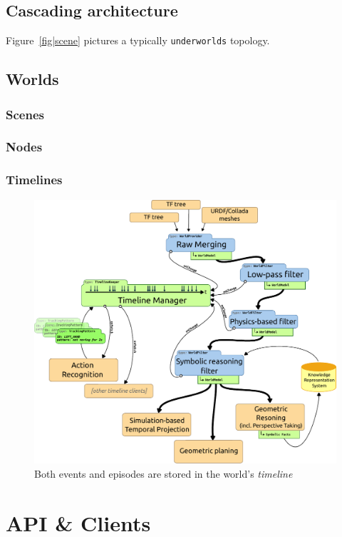 \documentclass[letterpaper, 10 pt, conference]{ieeeconf}  %
\newcommand{\uwds}{{\tt underworlds}\xspace}
\begin{document}
\subsection{Cascading architecture}

Figure~\ref{fig|scene} pictures a typically \uwds topology.


\subsection{Worlds}
\subsubsection{Scenes}

\subsubsection{Nodes}

\subsubsection{Timelines}

\begin{figure}
    \centering
    \includegraphics[width=0.9\linewidth]{timeline}
    \caption{Both events and episodes are stored in the world's \emph{timeline}}

    \label{fig|timeline}
\end{figure}

\section{API \& Clients}
\end{document}

